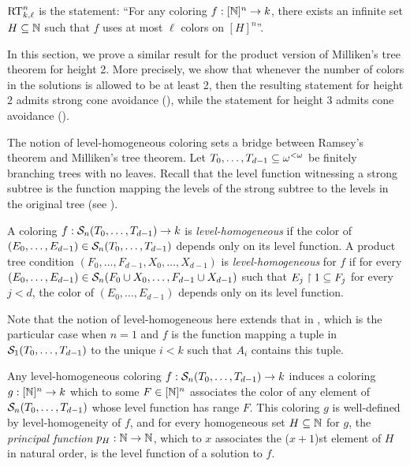 \begin{statement}
  $\mathrm{RT}^{n}_{k, \ell}$ is the statement: ``For any coloring $f: [\mathbb{N}]^n \to k$, there exists an infinite set $H\subseteq\mathbb{N}$ such that $f$ uses at most $\ell$ colors on $[H]^n$''.
\end{statement}

 
In this section, we prove a similar result for the product version of Milliken's tree theorem for height 2. More precisely, we show that whenever the number of colors in the solutions is allowed to be at least 2, then the resulting statement for height 2 admits strong cone avoidance (), while the statement for height 3 admits cone avoidance ().

The notion of level-homogeneous coloring sets a bridge between Ramsey's theorem and Milliken's tree theorem. Let $T_0, \dots, T_{d-1} \subseteq {\omega^{<\omega}}$ be finitely branching trees with no leaves. Recall that the level function witnessing a strong subtree is the function mapping the levels of the strong subtree to the levels in the original tree (see ).


\begin{definition}
A coloring $f: \mathcal{S}_{n}({T_0, \dots, T_{d-1}}) \to k$ is \emph{level-homogeneous}
if the color of $(E_0, \dots, E_{d-1}) \in \mathcal{S}_{n}({T_0, \dots, T_{d-1}})$ depends only on its level function. A product tree condition $(F_0, \dots, F_{d-1}, X_0, \dots, X_{d-1})$ is \emph{level-homogeneous} for $f$ if for every $(E_0, \dots, E_{d-1}) \in \mathcal{S}_{n}({F_0 \cup X_0, \dots, F_{d-1} \cup X_{d-1}})$ such that $E_j \upharpoonright 1 \subseteq F_j$ for every $j < d$,
the color of  $( E_0, \dots, E_{d-1} )$ depends only on its level function.
\end{definition}

\noindent Note that the notion of level-homogeneous here extends that in , which is the particular case when $n = 1$ and $f$ is the function mapping a tuple in $\mathcal{S}_{1}({T_0, \dots, T_{d-1}})$ to the unique $i < k$ such that $A_i$ contains this tuple.

Any level-homogeneous coloring $f:\mathcal{S}_{n}({T_0, \dots, T_{d-1}})\to k$
induce{s} a coloring $g: [\mathbb{N}]^n \to k$ which to some $F \in [\mathbb{N}]^n$ associates 
the color of any element of $\mathcal{S}_{n}({T_0, \dots, T_{d-1}})$ whose level 
function has range $F$. This coloring $g$ is well-defined by level-homogeneity of $f$,
and for every homogeneous set $H \subseteq \mathbb{N}$ for $g$, the \emph{principal function}  $p_H: \mathbb{N} \to \mathbb{N}$, which to $x$ associates the ($x+1$)st element of $H$ in natural order, is the level function of a solution to $f$. 

